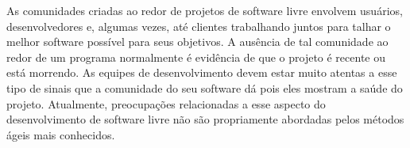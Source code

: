 As comunidades criadas ao redor de projetos de software livre envolvem
usuários, desenvolvedores e, algumas vezes, até clientes trabalhando
juntos para talhar o melhor software possível para seus objetivos. A
ausência de tal comunidade ao redor de um programa normalmente é
evidência de que o projeto é recente ou está morrendo. As equipes de
desenvolvimento devem estar muito atentas a esse tipo de sinais que a
comunidade do seu software dá pois eles mostram a saúde do
projeto. Atualmente, preocupações relacionadas a esse aspecto do
desenvolvimento de software livre não são propriamente abordadas pelos
métodos ágeis mais conhecidos.
